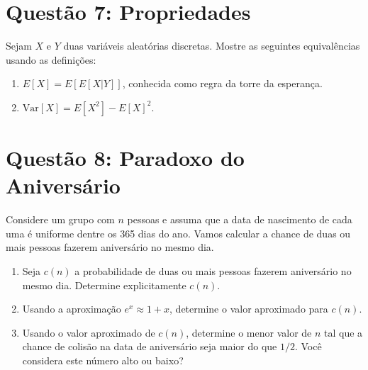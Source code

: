 \documentclass[12 pt]{article}
\begin{document}
\section*{Questão 7: Propriedades}
Sejam $X$ e $Y$ duas variáveis aleatórias discretas. Mostre as seguintes equivalências usando as definições:

\begin{enumerate}
    \item $E[X] = E[E[X|Y]]$, conhecida como regra da torre da esperança.
    \begin{tcolorbox}[colframe=black, title=Resposta:]

    \end{tcolorbox}
    \item $\text{Var}[X] = E[X^2] - E[X]^2$.
    \begin{tcolorbox}[colframe=black, title=Resposta:]

    \end{tcolorbox}
\end{enumerate}

\section*{Questão 8: Paradoxo do Aniversário}
Considere um grupo com $n$ pessoas e assuma que a data de nascimento de cada uma é uniforme dentre
os 365 dias do ano. Vamos calcular a chance de duas ou mais pessoas fazerem aniversário no mesmo dia.

\begin{enumerate}
    \item Seja $c(n)$ a probabilidade de duas ou mais pessoas fazerem aniversário no mesmo dia. Determine explicitamente $c(n)$.
    \begin{tcolorbox}[colframe=black, title=Resposta:]

    \end{tcolorbox}
    \item Usando a aproximação $e^x \approx 1 + x$, determine o valor aproximado para $c(n)$.
    \begin{tcolorbox}[colframe=black, title=Resposta:]

    \end{tcolorbox}
    \item Usando o valor aproximado de $c(n)$, determine o menor valor de $n$ tal que a chance de colisão na data de aniversário seja maior do que $1/2$. Você considera este número alto ou baixo?
    \begin{tcolorbox}[colframe=black, title=Resposta:]

    \end{tcolorbox}
\end{enumerate}
\end{document}
